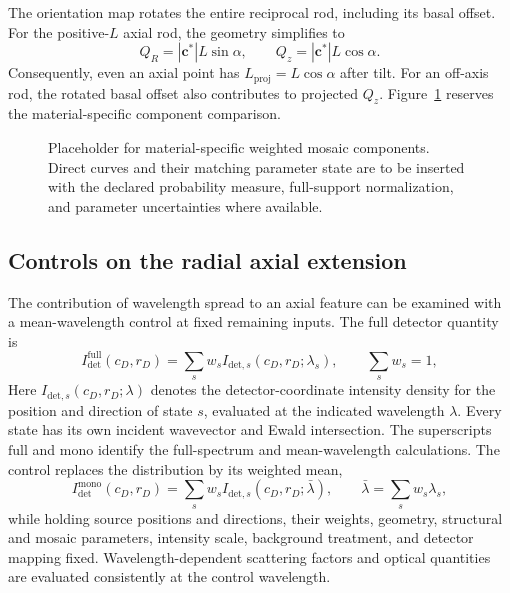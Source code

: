 The orientation map rotates the entire reciprocal rod, including its basal offset. For the positive-$L$ axial rod, the geometry simplifies to
\begin{equation}
Q_R=|\mathbf c^*|L\sin\alpha,\qquad Q_z=|\mathbf c^*|L\cos\alpha.
\label{eq:si_axial_tilt_geometry}
\end{equation}
Consequently, even an axial point has $L_{\mathrm{proj}}=L\cos\alpha$ after tilt. For an off-axis rod, the rotated basal offset also contributes to projected $Q_z$. Figure~\ref{fig:si_mosaic_results} reserves the material-specific component comparison.


\begin{figure}[!htbp]
  \centering
  \caption{Placeholder for material-specific weighted mosaic components. Direct curves and their matching parameter state are to be inserted with the declared probability measure, full-support normalization, and parameter uncertainties where available.}
  \label{fig:si_mosaic_results}
\end{figure}

\FloatBarrier
\subsection{Controls on the radial axial extension}

The contribution of wavelength spread to an axial feature can be examined
with a mean-wavelength control at fixed remaining inputs. The full detector quantity is
\begin{equation}
  I_{\mathrm{det}}^{\mathrm{full}}(c_D,r_D)=\sum_s w_s I_{\mathrm{det},s}(c_D,r_D;\lambda_s),
  \qquad
  \sum_s w_s=1,
  \label{eq:si_full_spectrum_control}
\end{equation}
Here $I_{\mathrm{det},s}(c_D,r_D;\lambda)$ denotes the detector-coordinate intensity density for the position and direction of state $s$, evaluated at the indicated wavelength $\lambda$. Every state has its own incident wavevector and Ewald intersection. The superscripts $\mathrm{full}$ and $\mathrm{mono}$ identify the full-spectrum and mean-wavelength calculations. The control replaces the distribution by its weighted mean,
\begin{equation}
  I_{\mathrm{det}}^{\mathrm{mono}}(c_D,r_D)=\sum_s w_s I_{\mathrm{det},s}(c_D,r_D;\bar\lambda),
  \qquad
  \bar\lambda=\sum_s w_s\lambda_s,
  \label{eq:si_mean_wavelength_control}
\end{equation}
while holding source positions and directions, their weights, geometry, structural
and mosaic parameters, intensity scale, background treatment, and detector mapping
fixed. Wavelength-dependent scattering factors and optical quantities are
evaluated consistently at the control wavelength.

